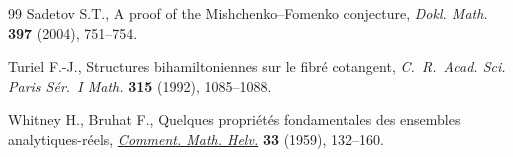 \documentclass[11pt]{article}
\numberwithin{equation}{section}
\begin{document}
\begin{thebibliography}{99}
Sadetov S.T., A proof of the {M}ishchenko--{F}omenko conjecture, \textit{Dokl.
 Math.} \textbf{397} (2004), 751--754.

Turiel F.-J., Structures bihamiltoniennes sur le fibr\'{e} cotangent,
 \textit{C.~R.~Acad. Sci. Paris S\'{e}r.~I Math.} \textbf{315} (1992),
 1085--1088.

Whitney H., Bruhat F., Quelques propri\'{e}t\'{e}s fondamentales des ensembles
 analytiques-r\'{e}els, \href{https://doi.org/10.1007/BF02565913}{\textit{Comment. Math. Helv.}} \textbf{33} (1959),
 132--160.

\end{thebibliography}
\end{document}
